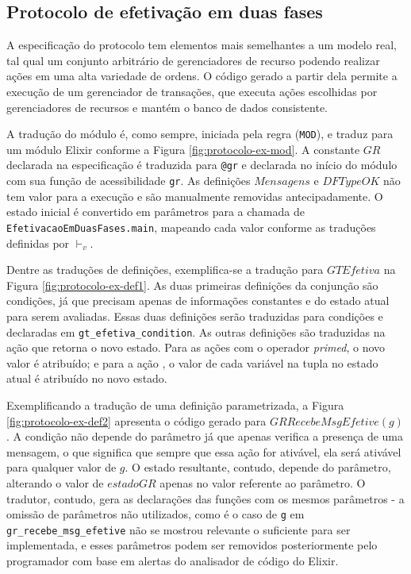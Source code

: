 \subsection{Protocolo de efetivação em duas fases}


A especificação do protocolo tem elementos mais semelhantes a um modelo real,
tal qual um conjunto arbitrário de gerenciadores de recurso podendo realizar
ações em uma alta variedade de ordens. O código gerado a partir dela permite a
execução de um gerenciador de transações, que executa ações escolhidas por
gerenciadores de recursos e mantém o banco de dados consistente.

A tradução do módulo é, como sempre, iniciada pela regra (\texttt{MOD}), e
traduz para um módulo Elixir conforme a Figura \ref{fig:protocolo-ex-mod}. A
constante $GR$ declarada na especificação é traduzida para \texttt{@gr} e
declarada no início do módulo com sua função de acessibilidade \texttt{gr}. As
definições $Mensagens$ e $DFTypeOK$ não tem valor para a execução e são
manualmente removidas antecipadamente. O
estado inicial é convertido em parâmetros para a chamada de
\texttt{EfetivacaoEmDuasFases.main}, mapeando cada valor conforme as traduções
definidas por $\vdash_v$.

Dentre as traduções de definições, exemplifica-se a tradução para
$GTEfetiva$ na Figura \ref{fig:protocolo-ex-def1}. As duas primeiras definições
da conjunção são condições, já que precisam apenas de informações constantes e
do estado atual para serem avaliadas. Essas duas definições serão traduzidas
para condições e declaradas em \texttt{gt\_efetiva\_condition}. As outras
definições são traduzidas na ação que retorna o novo estado. Para as ações com o
operador \textit{primed}, o novo valor é atribuído; e para a ação \UNCHANGED, o
valor de cada variável na tupla no estado atual é atribuído no novo estado.

Exemplificando a tradução de uma definição parametrizada, a Figura
\ref{fig:protocolo-ex-def2} apresenta o código gerado para
$GRRecebeMsgEfetive(g)$. A condição não depende do parâmetro já que apenas
verifica a presença de uma mensagem, o que significa que sempre que essa ação
for ativável, ela será ativável para qualquer valor de $g$. O estado resultante,
contudo, depende do parâmetro, alterando o valor de $estadoGR$ apenas no valor
referente ao parâmetro. O tradutor, contudo, gera as declarações das funções com
os mesmos parâmetros - a omissão de parâmetros não utilizados, como é o caso de
\texttt{g} em \texttt{gr\_recebe\_msg\_efetive} não se mostrou relevante o
suficiente para ser implementada, e esses parâmetros podem ser removidos
posteriormente pelo programador com base em alertas do analisador de código do
Elixir.

